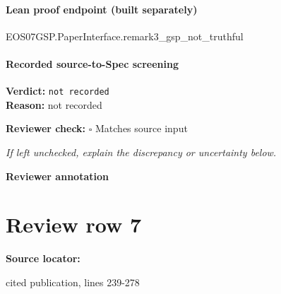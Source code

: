 \documentclass[10pt]{article}
\newcommand{\reviewerbox}{%
  \par\noindent\fbox{\parbox{0.96\linewidth}{\rule{0pt}{0.38in}}}\par
}
\newcommand{\reviewmatch}[1]{%
  \par\noindent\textbf{Reviewer check:} $\square$\; #1\par
  \noindent\emph{If left unchecked, explain the discrepancy or uncertainty below.}\par
}
\begin{document}
\paragraph{Lean proof endpoint (built separately)}\begin{ReviewVerbatim}
EOS07GSP.PaperInterface.remark3_gsp_not_truthful
\end{ReviewVerbatim}

\paragraph{Recorded source-to-Spec screening}
\textbf{Verdict:} \texttt{not recorded}
\\
\textbf{Reason:} not recorded
\reviewmatch{Matches source input}
\noindent\textbf{Reviewer annotation}\par
\reviewerbox
\clearpage
\hypertarget{source-claim-5798ec623309f406}{}
\section*{Review row 7}
\textbf{Source locator:} {\footnotesize\raggedright cited publication, lines 239-\allowbreak{}278\par}
\end{document}

